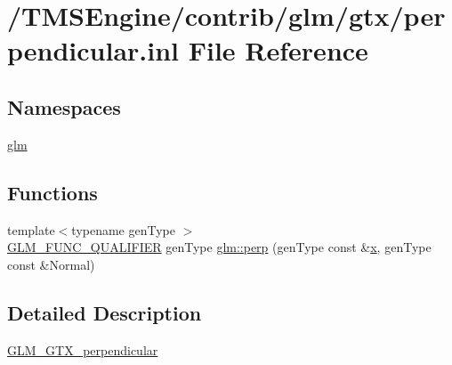 \hypertarget{perpendicular_8inl}{}\section{/\+T\+M\+S\+Engine/contrib/glm/gtx/perpendicular.inl File Reference}
\label{perpendicular_8inl}
\subsection*{Namespaces}
\begin{DoxyCompactItemize}
\item 
 \hyperlink{namespaceglm}{glm}
\end{DoxyCompactItemize}
\subsection*{Functions}
\begin{DoxyCompactItemize}
\item 
{\footnotesize template$<$typename gen\+Type $>$ }\\\hyperlink{setup_8hpp_a33fdea6f91c5f834105f7415e2a64407}{G\+L\+M\+\_\+\+F\+U\+N\+C\+\_\+\+Q\+U\+A\+L\+I\+F\+I\+ER} gen\+Type \hyperlink{group__gtx__perpendicular_ga264cfc4e180cf9b852e943b35089003c}{glm\+::perp} (gen\+Type const \&\hyperlink{_s_d_l__opengl_8h_ad0e63d0edcdbd3d79554076bf309fd47}{x}, gen\+Type const \&Normal)
\end{DoxyCompactItemize}


\subsection{Detailed Description}
\hyperlink{group__gtx__perpendicular}{G\+L\+M\+\_\+\+G\+T\+X\+\_\+perpendicular} 